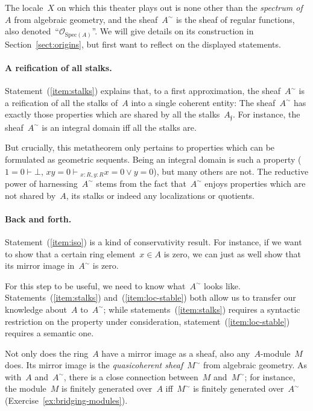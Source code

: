 \documentclass{ws-rv9x6}
\renewcommand{\O}{\mathcal{O}}
\newcommand{\fff}{\mathfrak{f}}
\newcommand{\Spec}{\mathrm{Spec}}
\renewcommand{\_}{\mathpunct{.}}
\newcommand{\?}{\,{:}\,}
\newcommand{\seq}[1]{\mathrel{\vdash\!\!\!_{#1}}}
\begin{document}
The locale~$X$ on which this theater plays out is none other than the
\emph{spectrum of~$A$} from algebraic geometry, and the sheaf~$A^\sim$ is the
sheaf of regular functions, also denoted~``$\O_{\Spec(A)}$''. We will give details on its construction in
Section~\ref{sect:origins}, but first want to reflect on the displayed
statements.

\paragraph{A reification of all stalks.}
Statement~(\ref{item:stalks}) explains that, to a first approximation, the
sheaf~$A^\sim$ is a reification of all the stalks of~$A$ into a single coherent
entity: The sheaf~$A^\sim$ has exactly those properties which are shared by all
the stalks~$A_\fff$. For instance, the sheaf~$A^\sim$ is an integral domain iff
all the stalks are.

But crucially, this metatheorem only pertains to properties which can be
formulated as geometric sequents. Being an integral domain is such a property
($1 = 0 \vdash \bot$, $xy = 0 \seq{x:R,y:R} x = 0 \vee y = 0$), but many others
are not. The reductive power of harnessing~$A^\sim$ stems from the fact
that~$A^\sim$ enjoys properties which are not shared by~$A$, its stalks or
indeed any localizations or quotients.

\paragraph{Back and forth.}
Statement~(\ref{item:iso}) is a kind of conservativity result.
For instance, if we
want to show that a certain ring element~$x \in A$ is zero, we can just as well
show that its mirror image in~$A^\sim$ is zero.

For this step to be useful, we need to know what~$A^\sim$ looks like.
Statements~(\ref{item:stalks}) and~(\ref{item:loc-stable}) both allow us to
transfer our knowledge about~$A$ to~$A^\sim$; while
statements~(\ref{item:stalks}) requires a syntactic restriction on the property
under consideration, statement~(\ref{item:loc-stable}) requires a semantic one.

Not only does the ring~$A$ have a mirror image as a sheaf, also
any~$A$-module~$M$ does. Its mirror image is the \emph{quasicoherent
sheaf}~$M^\sim$ from algebraic geometry. As with~$A$ and~$A^\sim$, there is a
close connection between~$M$ and~$M^\sim$; for instance, the module~$M$ is
finitely generated over~$A$ iff~$M^\sim$ is finitely generated over~$A^\sim$
(Exercise~\ref{ex:bridging-modules}).
\end{document}
